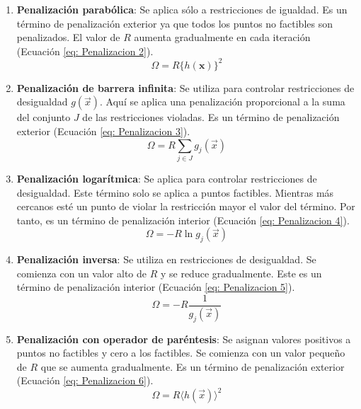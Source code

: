 \begin{enumerate}
\item \textbf{Penalización parabólica}: Se aplica sólo a restricciones de igualdad. Es un término de penalización exterior ya que todos los puntos no factibles son penalizados. El valor de $R$ aumenta gradualmente en cada iteración (Ecuación \ref{eq: Penalizacion 2}).
\begin{equation}\label{eq: Penalizacion 2}
\Omega=R \{h(\textbf{x})\}^2
\end{equation}

\item \textbf{Penalización de barrera infinita}: Se utiliza para controlar restricciones de desigualdad $g(\vec{x})$. Aquí se aplica una penalización proporcional a la suma del conjunto $J$ de las restricciones violadas. Es un término de penalización exterior  (Ecuación \ref{eq: Penalizacion 3}).
\begin{equation}\label{eq: Penalizacion 3}
\Omega=R \sum_{j \in J} g_j(\vec{x})
\end{equation}

\item \textbf{Penalización logarítmica}: Se aplica para controlar restricciones de desigualdad. Este término solo se aplica a puntos factibles. Mientras más cercanos esté un punto de violar la restricción mayor el valor del término. Por tanto, es un término de penalización interior (Ecuación \ref{eq: Penalizacion 4}).
\begin{equation}\label{eq: Penalizacion 4}
\Omega=- R \ln{g_j(\vec{x})}
\end{equation}
\item \textbf{Penalización inversa}: Se utiliza en restricciones de desigualdad. Se comienza con un valor alto de $R$ y se reduce gradualmente. Este es un término de penalización interior  (Ecuación \ref{eq: Penalizacion 5}).
\begin{equation}\label{eq: Penalizacion 5}
\Omega=- R \frac{1}{g_j(\vec{x})}
\end{equation}

\item \textbf{Penalización con operador de paréntesis}: Se asignan valores positivos a puntos no factibles y cero a los factibles.  Se comienza con un valor pequeño de $R$ que se aumenta gradualmente. Es un término de penalización exterior  (Ecuación \ref{eq: Penalizacion 6}).  
\begin{equation}\label{eq: Penalizacion 6}
\Omega=R \langle h(\vec{x})\rangle ^2
\end{equation}
\end{enumerate}

